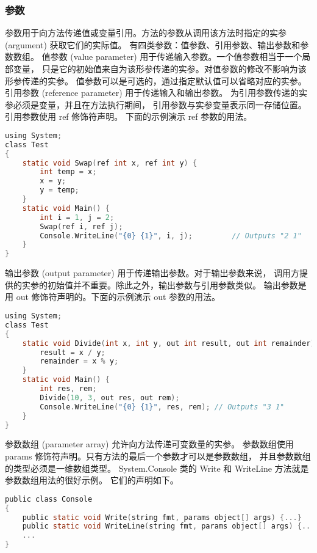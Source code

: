 \subsubsection{参数}
参数用于向方法传递值或变量引用。方法的参数从调用该方法时指定的实参 (argument) 获取它们的实际值。
有四类参数：值参数、引用参数、输出参数和参数数组。
值参数 (value parameter) 用于传递输入参数。一个值参数相当于一个局部变量，
只是它的初始值来自为该形参传递的实参。对值参数的修改不影响为该形参传递的实参。
值参数可以是可选的，通过指定默认值可以省略对应的实参。
引用参数 (reference parameter) 用于传递输入和输出参数。
为引用参数传递的实参必须是变量，并且在方法执行期间，
引用参数与实参变量表示同一存储位置。引用参数使用 ref 修饰符声明。
下面的示例演示 ref 参数的用法。

 \begin{lstlisting}[language=C]
using System;
class Test
{
    static void Swap(ref int x, ref int y) {
        int temp = x;
        x = y;
        y = temp;
    }
    static void Main() {
        int i = 1, j = 2;
        Swap(ref i, ref j);
        Console.WriteLine("{0} {1}", i, j);         // Outputs "2 1"
    }
}
 \end{lstlisting}

输出参数 (output parameter) 用于传递输出参数。对于输出参数来说，
调用方提供的实参的初始值并不重要。除此之外，输出参数与引用参数类似。
输出参数是用 out 修饰符声明的。下面的示例演示 out 参数的用法。

 \begin{lstlisting}[language=C]
using System;
class Test
{
    static void Divide(int x, int y, out int result, out int remainder) {
        result = x / y;
        remainder = x % y;
    }
    static void Main() {
        int res, rem;
        Divide(10, 3, out res, out rem);
        Console.WriteLine("{0} {1}", res, rem); // Outputs "3 1"
    }
}
 \end{lstlisting}

参数数组 (parameter array) 允许向方法传递可变数量的实参。
参数数组使用 params 修饰符声明。只有方法的最后一个参数才可以是参数数组，
并且参数数组的类型必须是一维数组类型。
System.Console 类的 Write 和 WriteLine 方法就是参数数组用法的很好示例。
它们的声明如下。

 \begin{lstlisting}[language=C]
public class Console
{
    public static void Write(string fmt, params object[] args) {...}
    public static void WriteLine(string fmt, params object[] args) {...}
    ...
}
 \end{lstlisting}

